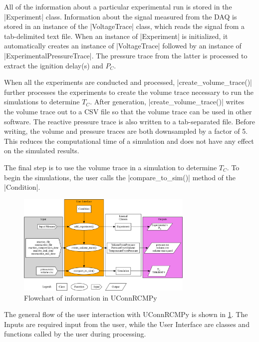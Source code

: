 \documentclass[12pt]{../ussci}
\begin{document}
All of the information about a particular experimental run is stored in
the \python|Experiment| class. Information about the signal
measured from the DAQ is stored in an instance of the
\python|VoltageTrace| class, which reads the signal from a
tab-delimited text file. When an instance of \python|Experiment|
is initialized, it automatically creates an instance of
\python|VoltageTrace| followed by an instance of
\python|ExperimentalPressureTrace|. The pressure trace from the
latter is processed to extract the ignition delay(s) and \(P_C\).

When all the experiments are conducted and processed,
\python|create_volume_trace()| further processes the experiments to
create the volume trace necessary to run the simulations to determine
\(T_C\). After generation, \python|create_volume_trace()| writes
the volume trace out to a CSV file so that the volume trace can be used in
other software. The reactive pressure trace is also written to a tab-separated
file. Before writing, the volume and pressure traces are both
downsampled by a factor of 5. This reduces the computational time of a
simulation and does not have any effect on the simulated results.

The final step is to use the volume trace in a simulation to determine
\(T_C\). To begin the simulations, the user calls the
\python|compare_to_sim()| method of the
\python|Condition|.

\begin{figure}[htbp]
    \centering
    \includegraphics[width=0.75\textwidth]{figures/flowchart.pdf}
    \caption{Flowchart of information in \mbox{UConnRCMPy}}
    \label{fig:flowchart}
\end{figure}

The general flow of the user interaction with UConnRCMPy is shown in
\cref{fig:flowchart}. The Inputs are required input from the
user, while the User Interface are classes and functions called by the
user during processing.
\end{document}
